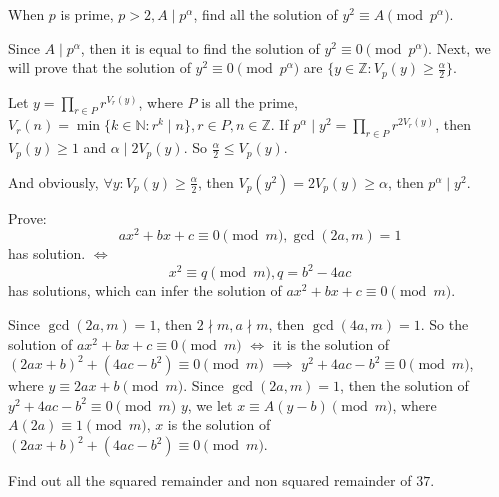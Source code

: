 \documentclass{ctexart}
\newif\ifpreface
\begin{document}
\large
\setlength{\baselineskip}{1.2em}
\ifpreface

\else
{}

\begin{problem}\label{pro:1}
  When \(p\) is prime, \(p > 2, A \mid p^\alpha\), find all the solution of \(y^2 \equiv A \pmod{p^\alpha}\).
\end{problem}
\begin{solution}
  Since \(A \mid p^{\alpha}\), then it is equal to find the solution of \(y^2 \equiv 0 \pmod{p^\alpha}\).
  Next, we will prove that the solution of \(y^2 \equiv 0 \pmod{p^\alpha}\) are \(\{y \in \mathbb{Z}: V_p(y) \geq \frac{\alpha }{2}\}\).

  Let \(y = \prod_{r \in P}r^{V_r(y)}\), where \(P\) is all the prime, \(V_r(n)=\min \{k \in \mathbb{N}:r^k \mid n \},r \in P, n \in \mathbb{Z}\).
  If \(p^\alpha \mid y^2 = \prod_{r \in P}r^{2V_r(y)}\), then \(V_p(y) \geq 1\) and \(\alpha \mid 2 V_p(y)\).
  So \(\frac{\alpha }{2}\leq V_p(y)\).

  And obviously, \(\forall y:V_p(y) \geq \frac{\alpha }{2}\), then \(V_p(y^2) =2V_p(y) \geq \alpha\), then \(p^\alpha \mid y^2\).
\end{solution}
\begin{problem}\label{pro:2}
  Prove:
  \[
    ax^2 + bx + c \equiv 0 \pmod{m},\gcd(2a,m)=1
  \]
  has solution.
  \(\iff\)
  \[
    x^2 \equiv q \pmod{m},q=b^2 -4ac
  \]
  has solutions, which can infer the solution of \(ax^2 + bx + c \equiv 0 \pmod{m}\).
\end{problem}
\begin{solution}
  Since \(\gcd(2a,m)=1\), then \(2 \nmid m, a \nmid m\), then \(\gcd(4a,m)=1\).
  So the solution of \(ax^2 + bx + c \equiv 0 \pmod{m}\) \(\iff\) it is the solution of \((2ax + b)^2 + (4ac -b^2) \equiv 0 \pmod{m}\)
  \(\implies\) \(y^2 + 4ac-b^2 \equiv 0 \pmod{m}\), where \(y \equiv 2ax + b \pmod{m}\).
  Since \(\gcd(2a,m)=1\), then the solution of \(y^2 + 4ac-b^2 \equiv 0 \pmod{m}\) \(y\), we
  let \(x \equiv A(y-b) \pmod{m}\), where \(A(2a) \equiv 1 \pmod{m}\),
  \(x\) is the solution of \((2ax + b)^2 + (4ac -b^2) \equiv 0 \pmod{m}\).

\end{solution}
\begin{problem}\label{pro:3}
  Find out all the squared remainder and non squared remainder of \(37\).
\end{problem}
\end{document}
